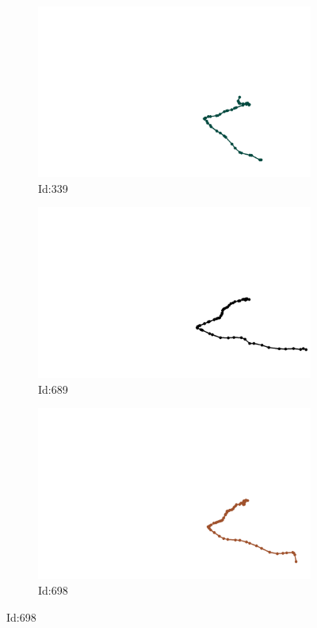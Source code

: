 \documentclass[12pt,twoside]{report}
\begin{document}
\begin{figure}
\centering
\begin{subfigure}[b]{0.20\textwidth}
\centering
\includegraphics[width=\textwidth]{../../trajectories/339.png}
\caption{Id:339}
\end{subfigure}
\begin{subfigure}[b]{0.20\textwidth}
\centering
\includegraphics[width=\textwidth]{../../trajectories/689.png}
\caption{Id:689}
\end{subfigure}
\begin{subfigure}[b]{0.20\textwidth}
\centering
\includegraphics[width=\textwidth]{../../trajectories/698.png}
\caption{Id:698}
\end{subfigure}
\end{figure}
\end{document}
